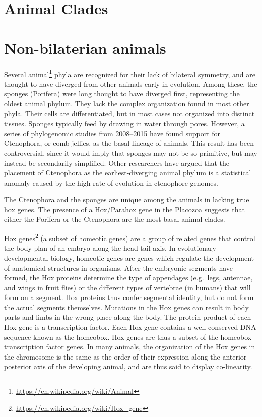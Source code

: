 \documentclass[]{book}
\let\rmarkdownfootnote\footnote%
\def\footnote{\protect\rmarkdownfootnote}
\renewcommand{\href}[2]{#2\footnote{\url{#1}}}
\theoremstyle{definition}
\theoremstyle{definition}
\theoremstyle{definition}
\theoremstyle{remark}
\begin{document}
\section{Animal Clades}\label{animal-clades}

\section{Non-bilaterian animals}\label{non-bilaterian-animals}

Several \href{https://en.wikipedia.org/wiki/Animal}{animal} phyla are
recognized for their lack of bilateral symmetry, and are thought to have
diverged from other animals early in evolution. Among these, the sponges
(Porifera) were long thought to have diverged first, representing the
oldest animal phylum. They lack the complex organization found in most
other phyla. Their cells are differentiated, but in most cases not
organized into distinct tissues. Sponges typically feed by drawing in
water through pores. However, a series of phylogenomic studies from
2008--2015 have found support for Ctenophora, or comb jellies, as the
basal lineage of animals. This result has been controversial, since it
would imply that sponges may not be so primitive, but may instead be
secondarily simplified. Other researchers have argued that the placement
of Ctenophora as the earliest-diverging animal phylum is a statistical
anomaly caused by the high rate of evolution in ctenophore genomes.

The Ctenophora and the sponges are unique among the animals in lacking
true hox genes. The presence of a Hox/Parahox gene in the Placozoa
suggests that either the Porifera or the Ctenophora are the most basal
animal clades.

\href{https://en.wikipedia.org/wiki/Hox_gene}{Hox genes} (a subset of
homeotic genes) are a group of related genes that control the body plan
of an embryo along the head-tail axis. In evolutionary developmental
biology, homeotic genes are genes which regulate the development of
anatomical structures in organisms. After the embryonic segments have
formed, the Hox proteins determine the type of appendages (e.g.~legs,
antennae, and wings in fruit flies) or the different types of vertebrae
(in humans) that will form on a segment. Hox proteins thus confer
segmental identity, but do not form the actual segments themselves.
Mutations in the Hox genes can result in body parts and limbs in the
wrong place along the body. The protein product of each Hox gene is a
transcription factor. Each Hox gene contains a well-conserved DNA
sequence known as the homeobox. Hox genes are thus a subset of the
homeobox transcription factor genes. In many animals, the organization
of the Hox genes in the chromosome is the same as the order of their
expression along the anterior-posterior axis of the developing animal,
and are thus said to display co-linearity.
\end{document}
